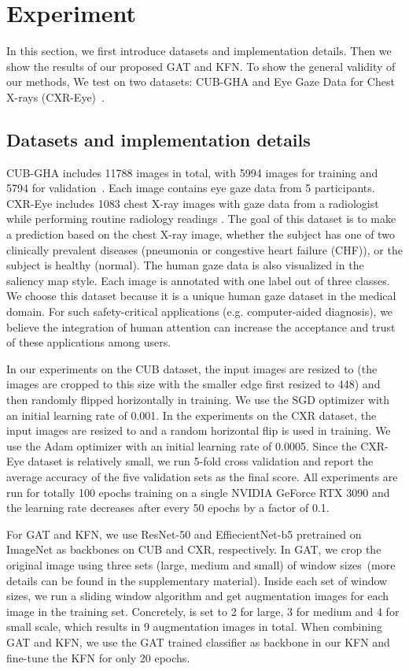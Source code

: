 \documentclass{bmvc2k}
\begin{document}
\section{Experiment}
\label{sec:experiments}
In this section, we first introduce datasets and implementation details. Then we show the results of our proposed GAT and KFN. To show the general validity of our methods, We test on two datasets: CUB-GHA and Eye Gaze Data for Chest X-rays (CXR-Eye)\ \cite{Karargyris2020}. 

\subsection{Datasets and implementation details}
CUB-GHA includes 11788 images in total, with 5994 images for training and 5794 for validation~\cite{WahCUB_200_2011}.
Each image contains eye gaze data from 5 participants. CXR-Eye includes 1083 chest X-ray images with gaze data from a radiologist while performing routine radiology readings \cite{Karargyris2020}. The goal of this dataset is to make a prediction based on the chest X-ray image, whether the subject has one of two clinically prevalent diseases (pneumonia or congestive heart failure (CHF)), or the subject is healthy (normal). The human gaze data is also visualized in the saliency map style. Each image is annotated with one label out of three classes. We choose this dataset because it is a unique human gaze dataset in the medical domain. For such safety-critical applications (e.g. computer-aided diagnosis), we believe the integration of human attention can increase the acceptance and trust of these applications among users.
 
In our experiments on the CUB dataset, the input images are resized to  (the images are cropped to this size with the smaller edge first resized to 448) and then randomly flipped horizontally in training. We use the SGD optimizer \cite{ruder2016overview} with an initial learning rate of 0.001. In the experiments on the CXR dataset, the input images are resized to  and a random horizontal flip is used in training. We use the Adam optimizer \cite{kingma2014adam} with an initial learning rate of 0.0005. Since the CXR-Eye dataset is relatively small, we run 5-fold cross validation and report the average accuracy of the five validation sets as the final score. All experiments are run for totally 100 epochs training on a single NVIDIA GeForce RTX 3090 and the learning rate decreases after every 50 epochs by a factor of 0.1.

For GAT and KFN, we use ResNet-50 \cite{he2016deep} and EffiecientNet-b5 \cite{tan2019efficientnet} pretrained on ImageNet as backbones on CUB and CXR, respectively. In GAT, we crop the original image using three sets (large, medium and small) of window sizes~(more details can be found in the supplementary material).
Inside each set of window sizes, we run a sliding window algorithm and get  augmentation images for each image in the training set. Concretely,  is set to 2 for large, 3 for medium and 4 for small scale, which results in 9 augmentation images in total. When combining GAT and KFN, we use the GAT trained classifier as backbone in our KFN and fine-tune the KFN for only 20 epochs. 
\end{document}
